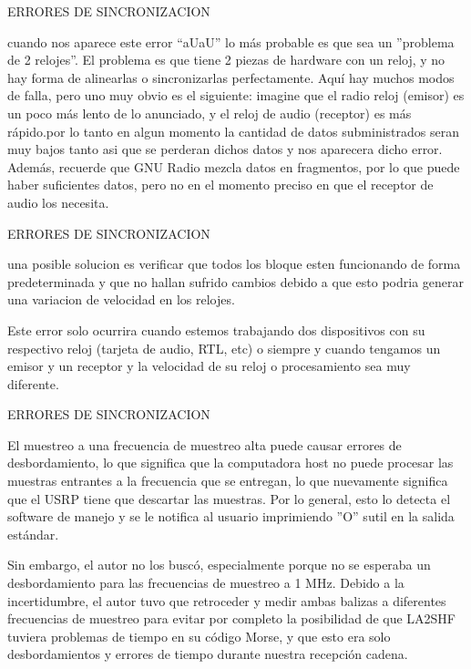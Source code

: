\begin{frame}{ERRORES DE SINCRONIZACION}

cuando nos aparece este error “aUaU” lo más probable es que sea un ”problema de 2 relojes”. El problema es que tiene 2 piezas de hardware con un reloj, y no hay forma de alinearlas o sincronizarlas perfectamente. Aquí hay muchos modos de falla, pero uno muy obvio es el siguiente: imagine que el radio reloj (emisor) es un poco más lento de lo anunciado, y el reloj de audio (receptor) es más rápido.por lo tanto en algun momento la cantidad de datos subministrados seran muy bajos tanto asi que se perderan dichos datos y nos aparecera dicho error. Además, recuerde que GNU Radio mezcla datos en fragmentos, por lo que puede haber
suficientes datos, pero no en el momento preciso en que el receptor de audio los necesita.\\ \vspace{2mm}

\end{frame}
\begin{frame}{ERRORES DE SINCRONIZACION}

una posible solucion es verificar que todos los bloque esten funcionando de forma predeterminada y que no hallan sufrido cambios debido a que esto podria generar una variacion de velocidad en los relojes.\\ \vspace{2mm}

Este error solo ocurrira cuando estemos trabajando dos dispositivos con su respectivo reloj (tarjeta de audio, RTL, etc) o siempre y cuando tengamos un emisor y un receptor y la velocidad de su reloj o procesamiento sea muy diferente.\\ \vspace{2mm}

\end{frame}

\begin{frame}{ERRORES DE SINCRONIZACION}

El muestreo a una frecuencia de muestreo alta puede causar errores de desbordamiento, lo que significa que la computadora host no puede procesar las muestras entrantes a la frecuencia que se entregan, lo que nuevamente significa que el USRP tiene que descartar las muestras. Por lo general, esto lo detecta el software de manejo y se le notifica al usuario imprimiendo ”O” sutil en la salida estándar. \\ \vspace{2mm}

Sin embargo, el autor no los buscó, especialmente porque no se esperaba un desbordamiento para las frecuencias de muestreo a 1 MHz. Debido a la incertidumbre, el autor tuvo que retroceder y medir ambas balizas a diferentes frecuencias de muestreo para evitar por completo la posibilidad de que LA2SHF tuviera problemas de tiempo en su código Morse, y que esto era solo desbordamientos y errores de tiempo durante nuestra recepción cadena.\\ \vspace{2mm}

\end{frame}


